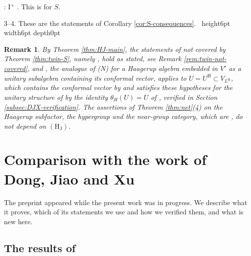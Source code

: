 \documentclass[leqno]{article}
\newcommand{\qed}{\hfill \vrule height6pt  width6pt depth0pt}
\newtheorem{remark}[thm]{Remark}
\newenvironment{proof}[1][]{\noindent {\it Proof #1} : }{\hbox{~}\qed
\smallskip
}
\numberwithin{equation}{section}
\begin{document}
\begin{proof}
I$^+$ \cite[Remark 4.16 p.~41]{Gui25}. This is \cite[Corollary 7.19(3)]{ArhII} for $S$.

3--4. These are the statements of Corollary \ref{cor:S-consequences}.
\end{proof}

\begin{remark}\normalfont
\label{rem:other-consequences}
By Theorem \ref{thm:HJ-main}, the statements of \cite[Section 12]{Arh26} not covered by Theorem \ref{thm:twin-S}, namely \cite[Theorem 12.4 and Remark 12.6]{Arh26}, hold as stated, see Remark \ref{rem:twin-not-covered}, and \cite[Theorem 8.6(2)]{ArhII}, the analogue of (N) for a Haagerup algebra embedded in $V'$ as a unitary subalgebra containing its conformal vector, applies to $U = U^{\mathrm H} \subset V_{L^{\mathrm H}}$, which contains the conformal vector by \cite[(4.9)]{DJX26} and satisfies these hypotheses for the unitary structure of \cite[Section 4.4]{DJX26} by the identity $\theta_H(U) = U$ of \cite[(6.15)]{DJX26}, verified in Section \ref{subsec:DJX-verification}. The assertions of Theorem \ref{thm:net}(4) on the Haagerup subfactor, the hypergroup and the near-group category, which are \cite[Corollaries 7.4 and 7.6 and Remark 7.8]{ArhII}, do not depend on $\mathrm{(H_J)}$.
\end{remark}


\section{Comparison with the work of Dong, Jiao and Xu}
\label{sec:DJX}

The preprint \cite{DJX26} appeared while the present work was in progress. We describe what it proves, which of its statements we use and how we verified them, and what is new here.


\subsection{\texorpdfstring{The results of \cite{DJX26}}{The results of Dong, Jiao and Xu}}
\end{document}
